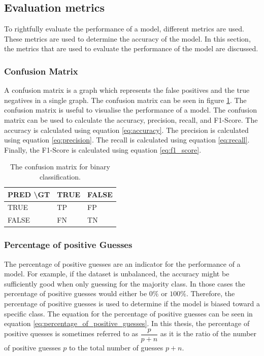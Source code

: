 \subsection{Evaluation metrics}

To rightfully evaluate the performance of a model, different metrics are used. These metrics are used to determine the accuracy of the model. In this section, the metrics that are used to evaluate the performance of the model are discussed.

\subsubsection{Confusion Matrix}

A confusion matrix is a graph which represents the false positives and the true negatives in a single graph. The confusion matrix can be seen in figure \ref{tab:confusion_matrix}. The confusion matrix is useful to visualise the performance of a model. The confusion matrix can be used to calculate the accuracy, precision, recall, and F1-Score. The accuracy is calculated using equation \ref{eq:accuracy}. The precision is calculated using equation \ref{eq:precision}. The recall is calculated using equation \ref{eq:recall}. Finally, the F1-Score is calculated using equation \ref{eq:f1_score}.

\begin{table}[]
    \caption{The confusion matrix for binary classification.}
    \label{tab:confusion_matrix}
    \centering
    \begin{tabular}{l|ll}
    PRED \textbackslash GT & TRUE & FALSE \\ \hline
    TRUE                   & TP   & FP    \\
    FALSE                  & FN   & TN   
    \end{tabular}
\end{table}

\subsubsection{Percentage of positive Guesses}

The percentage of positive guesses are an indicator for the performance of a model. For example, if the dataset is unbalanced, the accuracy might be sufficiently good when only guessing for the majority class. In those cases the percentage of positive guesses would either be $0\%$ or $100\%$. Therefore, the percentage of positive guesses is used to determine if the model is biased toward a specific class. The equation for the percentage of positive guesses can be seen in equation \ref{eq:percentage_of_positive_guesses}. In this thesis, the percentage of positive quesses is sometimes referred to as $\dfrac{p}{p + n}$ as it is the ratio of the number of positive guesses $p$ to the total number of guesses $p + n$.

